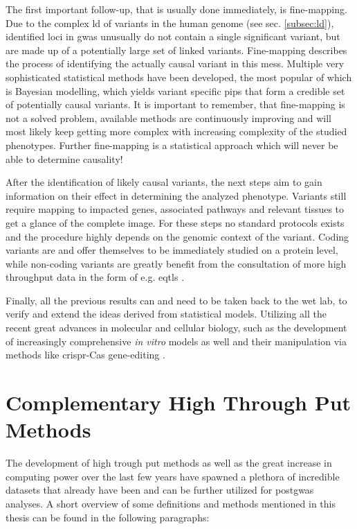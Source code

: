     The first important follow-up, that is usually done immediately, is fine-mapping. Due to the complex \ac{ld} of variants in the human genome (see sec. \ref{subsec:ld}), identified loci in \ac{gwas} unusually do not contain a single significant variant, but are made up of a potentially large set of linked variants. Fine-mapping describes the process of identifying the actually causal variant in this mess. Multiple very sophisticated statistical methods have been developed, the most popular of which is Bayesian modelling, which yields variant specific \acp{pip} that form a credible set of potentially causal variants. It is important to remember, that fine-mapping is not a solved problem, available methods are continuously improving and will most likely keep getting more complex with increasing complexity of the studied phenotypes. Further fine-mapping is a statistical approach which will never be able to determine causality! \cite{schaidGenomewideAssociationsCandidate2018, uffelmannGenomewideAssociationStudies2021}

    After the identification of likely causal variants, the next steps aim to gain information on their effect in determining the analyzed phenotype. Variants still require mapping to impacted genes, associated pathways and relevant tissues to get a glance of the complete image. For these steps no standard protocols exists and the procedure highly depends on the genomic context of the variant. Coding variants are and offer themselves to be immediately studied on a protein level, while non-coding variants are greatly benefit from the consultation of more high throughput data in the form of e.g. \acp{eqtl} \cite{uffelmannGenomewideAssociationStudies2021}.

    Finally, all the previous results can and need to be taken back to the wet lab, to verify and extend the ideas derived from statistical models. Utilizing all the recent great advances in molecular and cellular biology, such as the development of increasingly comprehensive \textit{in vitro} models as well and their manipulation via methods like \ac{crispr}-Cas gene-editing \cite{lichouFunctionalStudiesGWAS2020}.


    \section{Complementary High Through Put Methods}
    \label{sec:bioinformatics}
    The development of high trough put methods as well as the great increase in computing power over the last few years have spawned a plethora of incredible datasets that already have been and can be further utilized for post\ac{gwas} analyses. A short overview of some definitions and methods mentioned in this thesis can be found in the following paragraphs:

